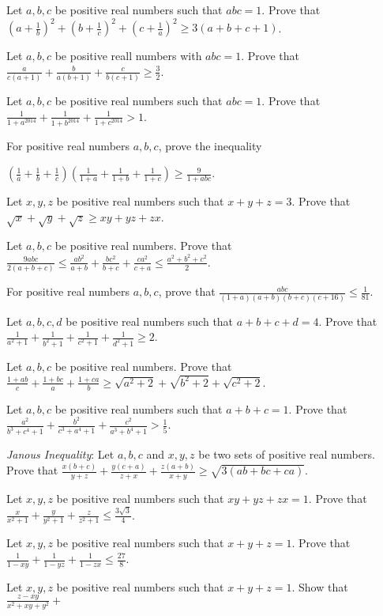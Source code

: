 \item Let $a, b, c$ be positive real numbers such that $abc = 1$. Prove that $\left(a + \frac{1}{b}\right)^2 + \left(b +
  \frac{1}{c}\right)^2 + \left(c + \frac{1}{a}\right)^2\geq 3(a + b + c + 1)$.
\item Let $a, b,c $ be positive reall numbers with $abc = 1$. Prove that $\frac{a}{c(a + 1)} + \frac{b}{a(b + 1)} + \frac{c}{b(c +
  1)}\geq \frac{3}{2}$.
\item Let $a, b, c$ be positive real numbers such that $abc = 1$. Prove that $\frac{1}{1 + a^{2014}} + \frac{1}{1 + b^{2014}} +
  \frac{1}{1 + c^{2014}} > 1$.
\item For positive real numbers $a, b, c$, prove the inequality

  $\left(\frac{1}{a} + \frac{1}{b} +
  \frac{1}{c}\right)\left(\frac{1}{1 + a} + \frac{1}{1 + b} + \frac{1}{1 + c}\right)\geq \frac{9}{1 + abc}$.
\item Let $x, y, z$ be positive real numbers such that $x + y + z = 3$. Prove that $\sqrt{x} + \sqrt{y} + \sqrt{z}\geq xy + yz +
  zx$.
\item Let $a, b, c$ be positive real numbers. Prove that $\frac{9abc}{2(a + b + c)}\leq \frac{ab^2}{a + b} + \frac{bc^2}{b + c} +
  \frac{ca^2}{c + a}\leq \frac{a^2 + b^2 + c^2}{2}$.
\item For positive real numbers $a, b, c$, prove that $\frac{abc}{(1 + a)(a + b)(b + c)(c + 16)}\leq \frac{1}{81}$.
\item Let $a, b, c, d$ be positive real numbers such that $a + b + c + d = 4$. Prove that $\frac{1}{a^2 + 1} + \frac{1}{b^2 + 1} +
  \frac{1}{c^2 + 1} + \frac{1}{d^2 + 1}\geq 2$.
\item Let $a, b, c$ be positive real numbers. Prove that $\frac{1 + ab}{c} + \frac{1 + bc}{a} + \frac{1 + ca}{b}\geq \sqrt{a^2 + 2}
  + \sqrt{b^2 + 2} + \sqrt{c^2 + 2}$.
\item Let $a, b, c$ be positive real numbers such that $a + b + c = 1$. Prove that $\frac{a^2}{b^3 + c^4 + 1} + \frac{b^2}{c^3 +
  a^4 + 1} + \frac{c^2}{a^3 + b^4 + 1} > \frac{1}{5}$.
\item {\it Janous Inequality}: Let $a, b, c$ and $x, y, z$ be two sets of positive real numbers. Prove that $\frac{x(b + c)}{y + z}
  + \frac{y(c + a)}{z + x} + \frac{z(a + b)}{x + y}\geq \sqrt{3(ab + bc + ca)}$.
\item Let $x, y, z$ be positive real numbers such that $xy + yz + zx = 1$. Prove that $\frac{x}{x^2 + 1} + \frac{y}{y^2 + 1} +
  \frac{z}{z^2 + 1}\leq \frac{3\sqrt{3}}{4}$.
\item Let $x, y, z$ be positive real numbers such that $x + y + z = 1$. Prove that $\frac{1}{1 - xy} + \frac{1}{1 - yz} +
  \frac{1}{1 - zx}\leq \frac{27}{8}$.
\item Let $x, y, z$ be positive real numbers such that $x + y + z = 1$. Show that $\frac{z - xy}{x^2 + xy + y^2} +$

